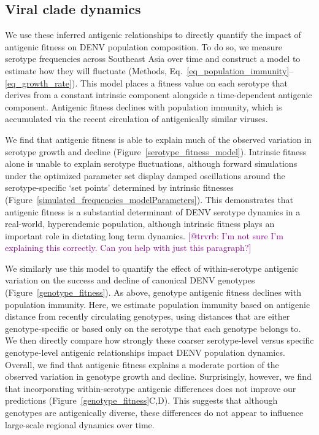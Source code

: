 \documentclass[11pt,oneside,letterpaper]{article}
\def\sbc#1{\textcolor{purple}{[#1]}}
\begin{document}
\subsection*{Viral clade dynamics}
We use these inferred antigenic relationships to directly quantify the impact of antigenic fitness on DENV population composition.
To do so, we measure serotype frequencies across Southeast Asia over time and construct a model to estimate how they will fluctuate (Methods, Eq.~\ref{eq_population_immunity}--\ref{eq_growth_rate}).
This model places a fitness value on each serotype that derives from a constant intrinsic component alongside a time-dependent antigenic component.
Antigenic fitness declines with population immunity, which is accumulated via the recent circulation of antigenically similar viruses.

We find that antigenic fitness is able to explain much of the observed variation in serotype growth and decline (Figure~\ref{serotype_fitness_model}).
Intrinsic fitness alone is unable to explain serotype fluctuations, although forward simulations under the optimized parameter set display damped oscillations around the serotype-specific `set points' determined by intrinsic fitnesses (Figure~\ref{simulated_frequencies_modelParameters}).
This demonstrates that antigenic fitness is a substantial determinant of DENV serotype dynamics in a real-world, hyperendemic population, although intrinsic fitness plays an important role in dictating long term dynamics.
\sbc{@trvrb: I'm not sure I'm explaining this correctly. Can you help with just this paragraph?}

We similarly use this model to quantify the effect of within-serotype antigenic variation on the success and decline of canonical DENV genotypes (Figure~\ref{genotype_fitness}).
As above, genotype antigenic fitness declines with population immunity.
Here, we estimate population immunity based on antigenic distance from recently circulating genotypes, using distances that are either genotype-specific or based only on the serotype that each genotype belongs to.
We then directly compare how strongly these coarser serotype-level versus specific genotype-level antigenic relationships impact DENV population dynamics.
Overall, we find that antigenic fitness explains a moderate portion of the observed variation in genotype growth and decline.
Surprisingly, however, we find that incorporating within-serotype antigenic differences does not improve our predictions (Figure~\ref{genotype_fitness}C,D).
This suggests that although genotypes are antigenically diverse, these differences do not appear to influence large-scale regional dynamics over time.
\end{document}
